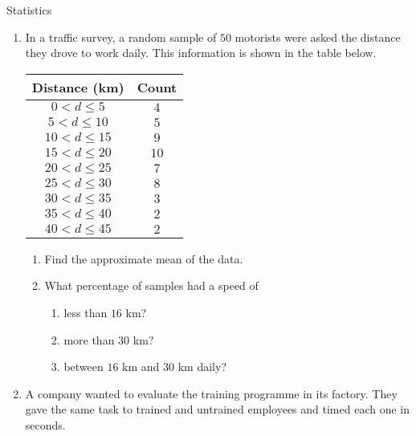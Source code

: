 \begin{eocexercises}{Statistics}
\begin{enumerate}[noitemsep, label=\textbf{\arabic*}.]
  \item In a traffic survey, a random sample of $50$ motorists were
    asked the distance they drove to work daily. This information is
    shown in the table below.
    \begin{center}
      \begin{tabular}{cc}
        \toprule
        Distance (km) & Count \\
        \midrule
        $0 < d \le 5$ & $4$ \\
        $5 < d \le 10$ & $5$ \\
        $10 < d \le 15$ & $9$ \\
        $15 < d \le 20$ & $10$ \\
        $20 < d \le 25$ & $7$ \\
        $25 < d \le 30$ & $8$ \\
        $30 < d \le 35$ & $3$ \\
        $35 < d \le 40$ & $2$ \\
        $40 < d \le 45$ & $2$ \\
        \bottomrule
      \end{tabular}
    \end{center}
    \begin{enumerate}
    \item Find the approximate mean of the data.
    \item What percentage of samples had a speed of
      \begin{enumerate}
      \item less than $16$ km?
      \item more than $30$ km?
      \item between $16$ km and $30$ km daily?
      \end{enumerate}
    \end{enumerate}

  \item A company wanted to evaluate the training programme in its
    factory. They gave the same task to trained and untrained
    employees and timed each one in seconds.


\end{enumerate}
\end{eocexercises}
